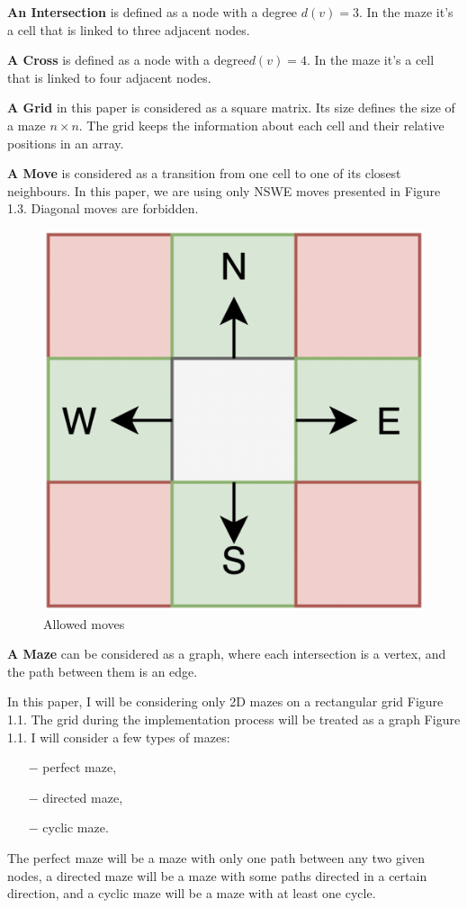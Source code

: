 \begin{definition}\textbf{An Intersection} is defined as a node with a degree $d(v) = 3$. In the maze it's a cell that is linked to three adjacent nodes.\end{definition}
\begin{definition}\textbf{A Cross} is defined as a node with a degree$d(v) = 4$. In the maze it's a cell that is linked to four adjacent nodes. \end{definition}
\begin{definition}\textbf{A Grid} in this paper is considered as a square matrix. Its size defines the size of a maze $n \times n$. The grid keeps the information about each cell and their relative positions in an array.\end{definition}
\begin{definition}\textbf{A Move} is considered as a transition from one cell to one of its closest neighbours. In this paper, we are using only NSWE moves presented in Figure 1.3. Diagonal moves are forbidden.
\newline
\begin{figure}[!h]
	\centering
	\includegraphics[width=.2\linewidth]{moves}
	\caption{Allowed moves}
\end{figure}		
\end{definition}
\newpage
\begin{definition}\textbf{A Maze} can be considered as a graph, where each intersection is a vertex, and the path between them is an edge. \end{definition}
In this paper, I will be considering only 2D mazes on a rectangular grid Figure 1.1. The grid during the implementation process will be treated as a graph Figure 1.1. I will consider a few types of mazes:
 \begin{itemize}
 \item[$-$] perfect maze,
 \item[$-$] directed maze,
 \item[$-$] cyclic maze.
 \end{itemize}
 The perfect maze will be a maze with only one path between any two given nodes, a directed maze will be a maze with some paths directed in a certain direction, and a cyclic maze will be a maze with at least one cycle. 
